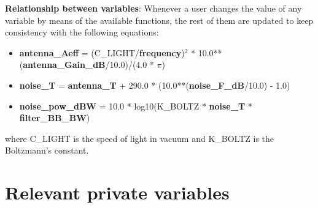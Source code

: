 {\bf Relationship between variables}: Whenever a user changes the value of any variable by means of the available functions, the rest of them are updated to keep consistency with the following equations:
\begin{itemize}
\item {\bf antenna\_Aeff} = (C\_LIGHT/{\bf frequency})$^2$ * 10.0**({\bf antenna\_Gain\_dB}/10.0)/(4.0 * $\pi$)

\item {\bf noise\_T} = {\bf antenna\_T} + 290.0 * (10.0**({\bf noise\_F\_dB}/10.0) - 1.0)

\item {\bf noise\_pow\_dBW} = 10.0 * log10(K\_BOLTZ * {\bf noise\_T} * {\bf filter\_BB\_BW})
\end{itemize}
where C\_LIGHT is the speed of light in vacuum and K\_BOLTZ is the Boltzmann's constant.


\section{Relevant private variables}

